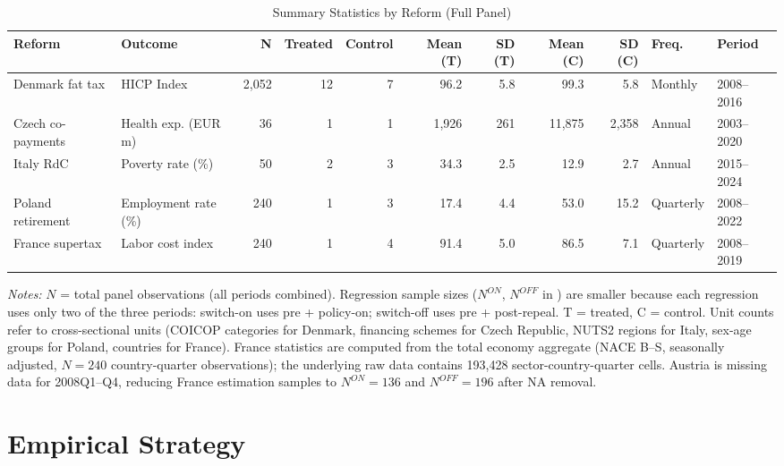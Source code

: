 \documentclass[12pt]{article}
\begin{document}
\begin{table}[H]
\centering
\caption{Summary Statistics by Reform (Full Panel)}
\label{tab:summary_stats}
\begin{adjustbox}{max width=\textwidth}
\begin{tabular}{llrrrrrrrll}
\toprule
Reform & Outcome & N & Treated & Control & Mean (T) & SD (T) & Mean (C) & SD (C) & Freq. & Period \\
\midrule
Denmark fat tax & HICP Index & 2,052 & 12 & 7 & 96.2 & 5.8 & 99.3 & 5.8 & Monthly & 2008--2016 \\
Czech co-payments & Health exp. (EUR m) & 36 & 1 & 1 & 1,926 & 261 & 11,875 & 2,358 & Annual & 2003--2020 \\
Italy RdC & Poverty rate (\%) & 50 & 2 & 3 & 34.3 & 2.5 & 12.9 & 2.7 & Annual & 2015--2024 \\
Poland retirement & Employment rate (\%) & 240 & 1 & 3 & 17.4 & 4.4 & 53.0 & 15.2 & Quarterly & 2008--2022 \\
France supertax & Labor cost index & 240 & 1 & 4 & 91.4 & 5.0 & 86.5 & 7.1 & Quarterly & 2008--2019 \\
\bottomrule
\end{tabular}
\end{adjustbox}
\par\vspace{0.3em}
{\small \textit{Notes:} $N$ = total panel observations (all periods combined). Regression sample sizes ($N^{ON}$, $N^{OFF}$ in ) are smaller because each regression uses only two of the three periods: switch-on uses pre + policy-on; switch-off uses pre + post-repeal. T = treated, C = control. Unit counts refer to cross-sectional units (COICOP categories for Denmark, financing schemes for Czech Republic, NUTS2 regions for Italy, sex-age groups for Poland, countries for France). France statistics are computed from the total economy aggregate (NACE B--S, seasonally adjusted, $N = 240$ country-quarter observations); the underlying raw data contains 193,428 sector-country-quarter cells. Austria is missing data for 2008Q1--Q4, reducing France estimation samples to $N^{ON} = 136$ and $N^{OFF} = 196$ after NA removal.}
\end{table}


\section{Empirical Strategy}
\label{sec:strategy}
\end{document}

